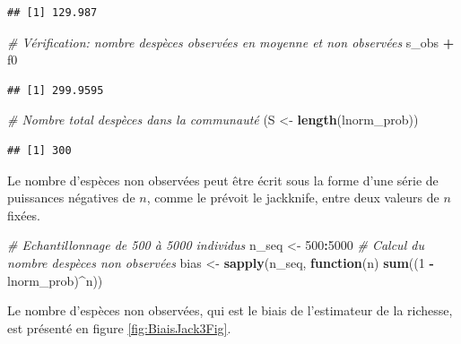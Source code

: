 \documentclass[
  11pt,
  american,
  a4paper,
  extrafontsizes,onecolumn,openright
  ]{memoir}
\newenvironment{Shaded}{\begin{snugshade}}{\end{snugshade}}
\newcommand{\CommentTok}[1]{\textcolor[rgb]{0.56,0.35,0.01}{\textit{#1}}}
\newcommand{\ControlFlowTok}[1]{\textcolor[rgb]{0.13,0.29,0.53}{\textbf{#1}}}
\newcommand{\DecValTok}[1]{\textcolor[rgb]{0.00,0.00,0.81}{#1}}
\newcommand{\FunctionTok}[1]{\textcolor[rgb]{0.13,0.29,0.53}{\textbf{#1}}}
\newcommand{\NormalTok}[1]{#1}
\newcommand{\OtherTok}[1]{\textcolor[rgb]{0.56,0.35,0.01}{#1}}
\newcommand{\SpecialCharTok}[1]{\textcolor[rgb]{0.81,0.36,0.00}{\textbf{#1}}}
\begin{document}
\begin{verbatim}
## [1] 129.987
\end{verbatim}

\begin{Shaded}
\begin{Highlighting}[]
\CommentTok{\# Vérification: nombre d\textquotesingle{}espèces observées en moyenne et non observées}
\NormalTok{s\_obs }\SpecialCharTok{+}\NormalTok{ f0}
\end{Highlighting}
\end{Shaded}

\begin{verbatim}
## [1] 299.9595
\end{verbatim}

\begin{Shaded}
\begin{Highlighting}[]
\CommentTok{\# Nombre total d\textquotesingle{}espèces dans la communauté}
\NormalTok{(S }\OtherTok{\textless{}{-}} \FunctionTok{length}\NormalTok{(lnorm\_prob))}
\end{Highlighting}
\end{Shaded}

\begin{verbatim}
## [1] 300
\end{verbatim}

\normalsize

Le nombre d'espèces non observées peut être écrit sous la forme d'une série de puissances négatives de \(n\), comme le prévoit le jackknife, entre deux valeurs de \(n\) fixées.

\scriptsize

\begin{Shaded}
\begin{Highlighting}[]
\CommentTok{\# Echantillonnage de 500 à 5000 individus}
\NormalTok{n\_seq }\OtherTok{\textless{}{-}} \DecValTok{500}\SpecialCharTok{:}\DecValTok{5000}
\CommentTok{\# Calcul du nombre d\textquotesingle{}espèces non observées}
\NormalTok{bias }\OtherTok{\textless{}{-}} \FunctionTok{sapply}\NormalTok{(n\_seq, }\ControlFlowTok{function}\NormalTok{(n) }\FunctionTok{sum}\NormalTok{((}\DecValTok{1} \SpecialCharTok{{-}}\NormalTok{ lnorm\_prob)}\SpecialCharTok{\^{}}\NormalTok{n))}
\end{Highlighting}
\end{Shaded}

\normalsize

Le nombre d'espèces non observées, qui est le biais de l'estimateur de la richesse, est présenté en figure \ref{fig:BiaisJack3Fig}.
\end{document}
